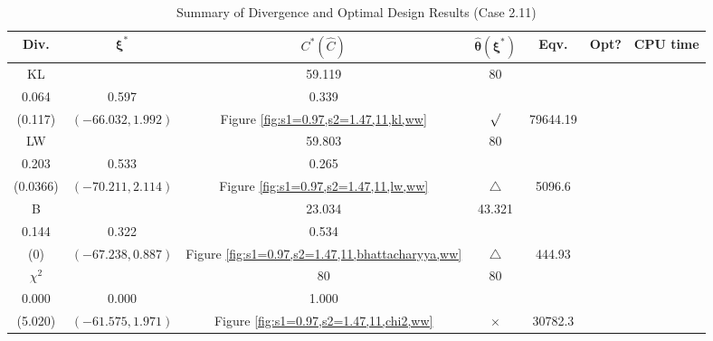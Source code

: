 \documentclass[12pt, a4paper]{article}
\begin{document}
\begin{table}[H]
\centering
\renewcommand{\arraystretch}{1.5} %
\setlength{\tabcolsep}{8pt} %
\begin{tabular}{|c|c|c|c|c|c|c|}
\hline
\textbf{Div.} & \(\boldsymbol{\xi^*}\) & \(C^* (\hat{C})\) & \(\boldsymbol{\hat{\theta}(\xi^*)}\) & \textbf{Eqv.} & \textbf{Opt?} & \textbf{CPU time} \\
\hline
KL & \(\left\{\begin{array}{ccc}
32.393 & 59.119 & 80 \\
0.064 & 0.597 & 0.339
\end{array}\right\}\) &
\(\begin{array}{c}
0.117 \\
(0.117)
\end{array}\) & 
\((-66.032, 1.992)\) & 
Figure \ref{fig:s1=0.97,s2=1.47,11,kl,ww} & $\surd$ & 79644.19 \\
\hline
LW & \(\left\{\begin{array}{ccc}
31.711 & 59.803 & 80 \\
0.203 & 0.533 & 0.265
\end{array}\right\}\) &
\(\begin{array}{c}
0.0386 \\
(0.0366)
\end{array}\) & 
\((-70.211, 2.114)\) & 
Figure \ref{fig:s1=0.97,s2=1.47,11,lw,ww} & $\triangle$ & 5096.6 \\
\hline
B & \(\left\{\begin{array}{ccc}
22.499 & 23.034 & 43.321 \\
0.144 & 0.322 & 0.534
\end{array}\right\}\) &
\(\begin{array}{c}
0 \\
(0)
\end{array}\) & 
\((-67.238, 0.887)\) & 
Figure \ref{fig:s1=0.97,s2=1.47,11,bhattacharyya,ww} & $\triangle$ & 444.93 \\
\hline
\(\chi^2\) & \(\left\{\begin{array}{ccc}
58.644 & 80 & 80 \\
0.000 & 0.000 & 1.000
\end{array}\right\}\) &
\(\begin{array}{c}
5.396 \\
(5.020)
\end{array}\) & 
\((-61.575, 1.971)\) & 
Figure \ref{fig:s1=0.97,s2=1.47,11,chi2,ww} & $\times$ & 30782.3 \\
\hline
\end{tabular}
\caption{Summary of Divergence and Optimal Design Results (Case 2.11)}
\label{tab:results2.11}
\end{table}
\end{document}
